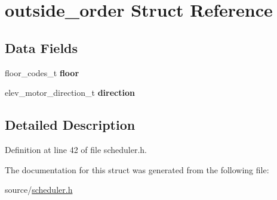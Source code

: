 \hypertarget{structoutside__order}{}\section{outside\+\_\+order Struct Reference}
\label{structoutside__order}
\subsection*{Data Fields}
\begin{DoxyCompactItemize}
\item 
floor\+\_\+codes\+\_\+t {\bfseries floor}\hypertarget{structoutside__order_a46a26592b06dc0c6c95462014a8087c2}{}\label{structoutside__order_a46a26592b06dc0c6c95462014a8087c2}

\item 
elev\+\_\+motor\+\_\+direction\+\_\+t {\bfseries direction}\hypertarget{structoutside__order_a542a2b3f86ab377e9cff750de95e1fe3}{}\label{structoutside__order_a542a2b3f86ab377e9cff750de95e1fe3}

\end{DoxyCompactItemize}


\subsection{Detailed Description}


Definition at line 42 of file scheduler.\+h.



The documentation for this struct was generated from the following file\+:\begin{DoxyCompactItemize}
\item 
source/\hyperlink{scheduler_8h}{scheduler.\+h}\end{DoxyCompactItemize}
